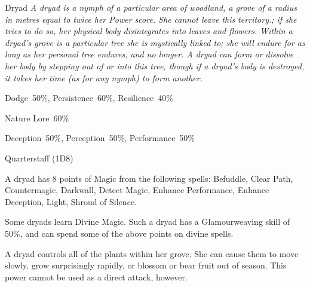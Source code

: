 \begin{monsterbox}{Dryad}
	\textit{A dryad is a nymph of a particular area of woodland, a grove of a radius in metres equal to twice her Power score. She cannot leave this territory.; if she tries to do so, her physical body disintegrates into leaves and flowers. Within a dryad’s grove is a particular tree she is mystically linked to; she will endure for as long as her personal tree endures, and no longer. A dryad can form or dissolve her body by stepping out of or into this tree, though if a dryad’s body is destroyed, it takes her time (as for any nymph) to form another.}\\
	\rpghline
	\basics[%
        hitpoints  = 11, 
	majorwound = 6,
	damagemodifier = 0,
	powerpoints = 22,
	movementrate = 15m,
	armor = None,
	plunderrating = 1
	]
	\rpghline%
	\stats[ %
		STR = 2D6    (7),
		CON = 3D6    (11),
		DEX = 4D6    (14),
		SIZ = 2D6+3  (10),
		INT = 3D6+6  (17),
		POW = 2D6+15 (22),
		CHA = 2D6+12 (19)
	]
	\rpghline%
	\begin{rpg-monsteraction}[Resistances]
		Dodge~50\%, Persistence~60\%, Resilience~40\%
	\end{rpg-monsteraction}
	\begin{rpg-monsteraction}[Knowledge]
		Nature Lore~60\%
	\end{rpg-monsteraction}
	\begin{rpg-monsteraction}[Practical]
		Deception~50\%, Perception~50\%, Performance~50\%
	\end{rpg-monsteraction}
	\begin{rpg-monsteraction}
		Quarterstaff (1D8)
	\end{rpg-monsteraction}
	\begin{rpg-monsteraction}[Magic 60\%]
		A dryad has 8 points of Magic from the following spells: Befuddle, Clear Path, Countermagic, Darkwall, Detect Magic, Enhance Performance, Enhance Deception, Light, Shroud of Silence.
	\end{rpg-monsteraction}
	\begin{rpg-monsteraction}
		Some dryads learn Divine Magic. Such a dryad has a Glamourweaving skill of 50\%, and can spend some of the above points on divine spells. 
	\end{rpg-monsteraction}
	\begin{rpg-monsteraction}
		A dryad controls all of the plants within her grove. She can cause them to move slowly, grow surprisingly rapidly, or blossom or bear fruit out of season. This power cannot be used as a direct attack, however.
	\end{rpg-monsteraction}

\end{monsterbox}

